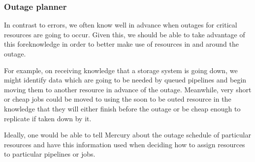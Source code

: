 \documentclass[10pt,a4paper]{article}
\newcommand{\npar}{\par\noindent\space}
\begin{document}
\subsubsection{Outage planner}
\label{sec:outagePlanner}
\npar In contrast to errors, we often know well in advance when outages for critical resources are going to occur. Given this, we should be able to take advantage of this foreknowledge in order to better make use of resources in and around the outage.
\npar For example, on receiving knowledge that a storage system is going down, we might identify data which are going to be needed by queued pipelines and begin moving them to another resource in advance of the outage. Meanwhile, very short or cheap jobs could be moved to using the soon to be outed resource in the knowledge that they will either finish before the outage or be cheap enough to replicate if taken down by it.
\npar Ideally, one would be able to tell Mercury about the outage schedule of particular resources and have this information used when deciding how to assign resources to particular pipelines or jobs.
\end{document}
